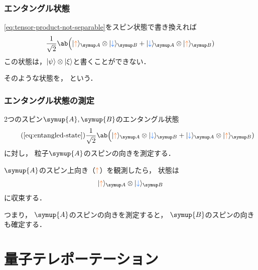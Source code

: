 \documentclass[
    10pt,
    ]{sotsu-beamer}
\newcommand{\bitone}{\mathcolor{fire}{\uparrow}}
\newcommand{\bittwo}{\mathcolor{water}{\downarrow}}
\begin{document}
\begin{frame}
    \frametitle{エンタングル状態}
    
    \eqref{eq:tensor-product-not-separable}をスピン状態で書き換えれば
    \begin{equation}
        \label{eq:entangled-state}
        \frac{1}{\sqrt{2}} \ab\Big( 
            \ket{\bitone}<A> \otimes \ket{\bittwo}<B>
            + \ket{\bittwo}<A> \otimes \ket{\bitone}<B>
        )
    \end{equation}
    この状態は，$\ket{\psi} \otimes \ket{\xi}$と書くことができない．

    そのような状態を，
    という．
    
\end{frame}


\begin{frame}
    \frametitle{エンタングル状態の測定}

    2つのスピン$\symup{A}, \symup{B}$のエンタングル状態
    \begin{equation*}
        \tag{\ref*{eq:entangled-state}}
        \frac{1}{\sqrt{2}} \ab\Big( 
            \ket{\bitone}<A> \otimes \ket{\bittwo}<B>
            + \ket{\bittwo}<A> \otimes \ket{\bitone}<B>
        )
    \end{equation*}
    に対し，
    粒子$\symup{A}$のスピンの向きを測定する．

    \pause

    $\symup{A}$のスピン上向き（$\bitone$）を観測したら，
    状態は
    \begin{equation*}
            \ket{\bitone}<A> \otimes \ket{\bittwo}<B>
    \end{equation*}
    に収束する．

    つまり，
    \alert{$\symup{A}$のスピンの向きを測定すると，
    $\symup{B}$のスピンの向きも確定する．}

\end{frame}


\section{量子テレポーテーション}
\end{document}
